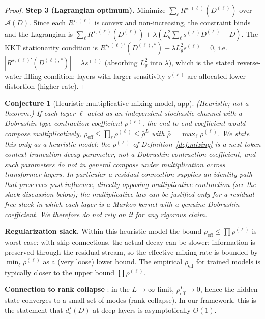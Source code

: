 \documentclass[11pt]{article}
\theoremstyle{plain}
\newtheorem{conjecture}[theorem]{Conjecture}
\theoremstyle{definition}
\theoremstyle{remark}
\begin{document}
\begin{proof}
\textbf{Step 3 (Lagrangian optimum).} Minimize
$\sum_\ell R^{\star,(\ell)}(D^{(\ell)})$ over
$\mathcal{A}(D)$. Since each $R^{\star,(\ell)}$ is convex and
non-increasing, the constraint binds and the Lagrangian is
$\sum_\ell R^{\star,(\ell)}(D^{(\ell)}) + \lambda(L_g^2 \sum_\ell
s^{(\ell)} D^{(\ell)} - D)$. The KKT stationarity condition is
$R^{\star,(\ell)\prime}(D^{(\ell),*}) + \lambda L_g^2 s^{(\ell)} =
0$, i.e.\ $|R^{\star,(\ell)\prime}(D^{(\ell),*})| = \lambda
s^{(\ell)}$ (absorbing $L_g^2$ into $\lambda$), which is the stated
reverse-water-filling condition: layers with larger sensitivity
$s^{(\ell)}$ are allocated lower distortion (higher rate).
\end{proof}

\begin{conjecture}[Heuristic multiplicative mixing model, app]\label{thm:multi-mixing-app}
\emph{(Heuristic; not a theorem.)} If each layer $\ell$ acted as an
independent stochastic channel with a Dobrushin-type contraction
coefficient $\rho^{(\ell)}$, the end-to-end coefficient would compose
multiplicatively, $\rho_{\mathrm{eff}} \le \prod_\ell \rho^{(\ell)}
\le \bar\rho^L$ with $\bar\rho = \max_\ell \rho^{(\ell)}$. We state this
only as a heuristic model: the $\rho^{(\ell)}$ of
Definition~\ref{def:mixing} is a next-token context-truncation decay
parameter, \emph{not} a Dobrushin contraction coefficient, and such
parameters do not in general compose under multiplication across
transformer layers. In particular a residual connection supplies an
identity path that preserves past influence, directly opposing
multiplicative contraction (see the slack discussion below); the
multiplicative law can be justified only for a residual-free stack in
which each layer is a Markov kernel with a genuine Dobrushin
coefficient. We therefore do not rely on it for any rigorous claim.
\end{conjecture}

\textbf{Regularization slack.} Within this heuristic model the bound
$\rho_{\mathrm{eff}} \leq \prod \rho^{(\ell)}$ is worst-case: with skip
connections, the actual decay can be slower:
information is preserved through the residual stream, so the effective
mixing rate is bounded by $\min_\ell \rho^{(\ell)}$ as a (very loose)
lower bound. The empirical $\rho_{\mathrm{eff}}$ for trained models is
typically closer to the upper bound $\prod \rho^{(\ell)}$.

\textbf{Connection to rank collapse} \citep{dong2021attention}: in the
$L \to \infty$ limit, $\rho_{\mathrm{eff}}^L \to 0$, hence the hidden
state converges to a small set of modes (rank collapse). In our
framework, this is the statement that $d^\star_t(D)$ at deep layers is
asymptotically $O(1)$.
\end{document}
